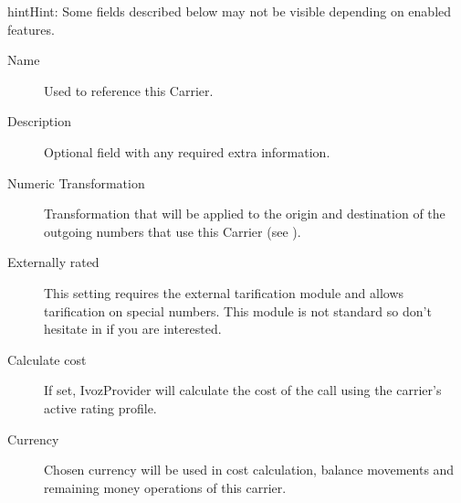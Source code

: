 \documentclass[letterpaper,10pt,english]{sphinxmanual}
\begin{document}
\begin{notice}{hint}{Hint:}
Some fields described below may not be visible depending on enabled features.
\end{notice}
\begin{description}
\item[{Name}] \leavevmode{}\label{administration_portal/brand/providers/carriers:term-name}
Used to reference this Carrier.

\item[{Description}] \leavevmode{}\label{administration_portal/brand/providers/carriers:term-description}
Optional field with any required extra information.

\item[{Numeric Transformation}] \leavevmode{}\label{administration_portal/brand/providers/carriers:term-numeric-transformation}
Transformation that will be applied to the origin and destination of the
outgoing numbers that use this Carrier
(see {\hyperref[administration_portal/brand/settings/numeric_transformations:numeric\string-transformations]{}}).

\item[{Externally rated}] \leavevmode{}\label{administration_portal/brand/providers/carriers:term-externally-rated}
This setting requires the external tarification module and allows
tarification on special numbers. This module is not standard so don't
hesitate in {\hyperref[basic_concepts/intro/getting_help:getting\string-help]{}} if you are interested.

\item[{Calculate cost}] \leavevmode{}\label{administration_portal/brand/providers/carriers:term-calculate-cost}
If set, IvozProvider will calculate the cost of the call using the carrier's active rating profile.

\item[{Currency}] \leavevmode{}\label{administration_portal/brand/providers/carriers:term-currency}
Chosen currency will be used in cost calculation, balance movements and
remaining money operations of this carrier.

\end{description}
\end{document}
